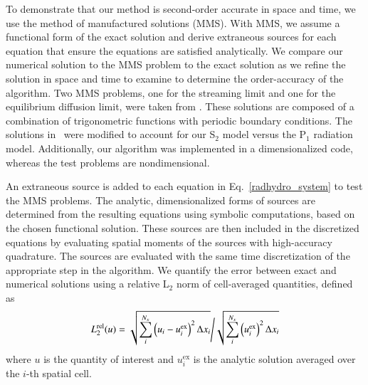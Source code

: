 \documentclass[preprint,12pt]{elsarticle}
\newcommand{\bracket}[1]{\left[ #1 \right]}
\newcommand{\fn}[1]{\left( #1 \right)}
\newcommand{\dxdy}[2]{\frac{\partial #1}{\partial #2}}
\newcommand{\dydt}[1]{\frac{\partial #1}{\partial t}}
\newcommand{\pec}{\, ,}
\newcommand{\pep}{\, .}
\newcommand{\E}{{E_r}}
\newcommand{\F}{{F_r}}
\newcommand{\Q}{\mathcal{Q}}
\begin{document}
To demonstrate that our method is second-order accurate in space and time, we use the method of manufactured solutions (MMS).    
With MMS, we assume a functional form of the exact solution and  derive extraneous sources for each equation that ensure the
equations are satisfied analytically.  We compare our numerical solution to the MMS problem to the exact solution as we refine the
solution in space and time to examine to determine the order-accuracy of the algorithm.  
Two MMS problems, one for the streaming limit and one for the equilibrium diffusion limit, were taken from \cite{mcclarren2}.  These
solutions are composed of a combination of trigonometric functions with periodic boundary conditions.  The solutions in~\cite{mcclarren2}
were modified to account for our S$_2$ model versus the P$_1$ radiation model. Additionally, our algorithm was implemented in a
dimensionalized code, whereas the test problems are nondimensional. 

An extraneous source is added
to each equation in Eq.~\eqref{radhydro_system} to test the MMS problems. The analytic,
dimensionalized forms of  sources are determined from the resulting equations using symbolic computations, based on the chosen functional solution.
These sources are then included in the discretized equations by evaluating spatial moments of the sources with high-accuracy quadrature.  The sources are
evaluated with the same time discretization of the appropriate step in the algorithm.  
We quantify the error between exact and numerical solutions using a relative L$_2$ norm of cell-averaged quantities, defined as
\begin{equation}
    \left.  L^{\mathrm{rel}}_2(u) = \sqrt{\sum\limits_i^{N_x} \left(u_i - u_i^{\text{ex}} \right)^2 \Delta x_i} \middle / 
    \sqrt{\sum\limits_i^{N_x} \left(u_i^{\text{ex}}\right)^2 \Delta x_i}  \right.
\end{equation}
where $u$ is the quantity of interest and $u_i^{\text{ex}}$ is the analytic solution averaged over the $i$-th spatial cell.  

\end{document}
